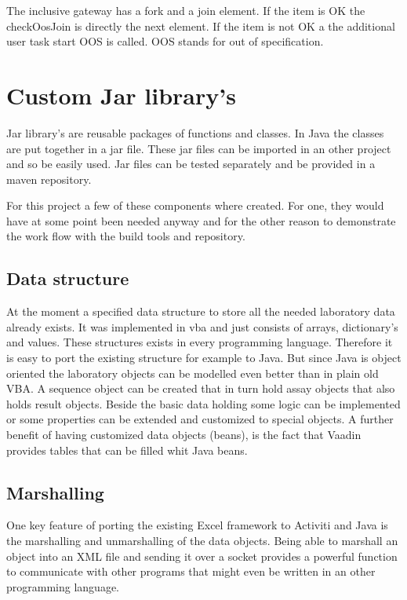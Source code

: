 \documentclass[paper=a4,twoside=false,BCOR=0mm,DIV=calc,fontsize=12pt]{scrartcl}
\begin{document}
The inclusive gateway has a fork and a join element. If the item is OK the checkOosJoin is directly the next element. If the item is not OK a the additional user task start OOS is called. OOS stands for out of specification.

\section{Custom Jar library's}
Jar library's are reusable packages of functions and classes. In Java the classes are put together in a jar file. These jar files can be imported in an other project and so be easily used.
Jar files can be tested separately and be provided in a maven repository.

For this project a few of these components where created. For one, they would have at some point been needed anyway and for the other reason to
demonstrate the work flow with the build tools and repository.



\subsection{Data structure}
At the moment a specified data structure to store all the needed laboratory data already exists. It was implemented in vba and just consists of
arrays, dictionary's and values. These structures exists in every programming language. Therefore it is easy to port the existing structure for
example to Java. But since Java is object oriented the laboratory objects can be modelled even better than in plain old VBA. A sequence object can be
created that in turn hold assay objects that also holds result objects. Beside the basic data holding some logic can be implemented or some properties
can be extended and customized to special objects. A further benefit of having customized data objects (beans), is the fact that Vaadin provides
tables that can be filled whit Java beans.




\subsection{Marshalling}
One key feature of porting the existing Excel framework to Activiti and Java is the marshalling and unmarshalling of the data objects.
Being able to marshall an object into an XML file and sending it over a socket provides a powerful function to communicate with other programs that
might even be written in an other programming language.
\end{document}
